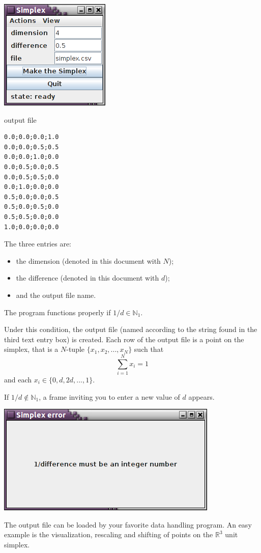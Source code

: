 \documentclass[12pt,a4paper]{article}
\begin{document}
\begin{minipage}{0.5\textwidth}
\includegraphics[scale=1]{fig1.png}
\end{minipage}
\hspace{1cm}
\begin{minipage}{0.4\textwidth}
output file 

\begin{verbatim}
0.0;0.0;0.0;1.0
0.0;0.0;0.5;0.5
0.0;0.0;1.0;0.0
0.0;0.5;0.0;0.5
0.0;0.5;0.5;0.0
0.0;1.0;0.0;0.0
0.5;0.0;0.0;0.5
0.5;0.0;0.5;0.0
0.5;0.5;0.0;0.0
1.0;0.0;0.0;0.0
\end{verbatim}
\end{minipage}

\vspace{1cm}

The three entries are: 
\begin{itemize}
\item the dimension (denoted in this document with $N$);
\item the difference (denoted in this document with $d$);
\item and the output file name.
\end{itemize}

The program functions properly if $1/d \in \mathbb{N}_1$.


Under this condition, the output file (named according to the string found in the third text entry box) is created. Each row of the output file is a point on the simplex, that is a $N$-tuple $\{x_1,x_2,...,x_N\}$ such that
\[
\sum_{i=1}^N x_i=1
\]
and each $x_i \in \{0,d,2d,...,1\}$.

If $1/d  \notin \mathbb{N}_1$, a frame inviting you to enter a new value of $d$ appears.

\vspace{1cm}
\centerline{\includegraphics[scale=0.6]{fig2.png}} 
\newpage
The output file can be loaded by your favorite data handling program. 
An easy example is the visualization, rescaling and shifting of points on the $\mathbb{R}^3$ unit simplex.
\end{document}
